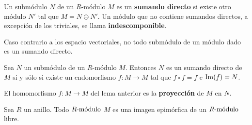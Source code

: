 \begin{definicion}
Un submódulo $N$ de un $R\mbox{-módulo}$ $M$ es un \textbf{sumando directo} si existe otro módulo $N'$ tal que $M = N \oplus N'$. Un módulo que no contiene sumandos directos, a excepción de los triviales, se llama \textbf{indescomponible}. 
\end{definicion}
Caso contrario a los espacio vectoriales, no todo submódulo de un módulo dado es un sumando directo.
\begin{lema}
Sea $N$ un submódulo de un $R\mbox{-módulo}$ $M$. Entonces $N$ es un sumando directo de $M$ si y sólo si existe un endomorfismo $f \colon M \to M$ tal que $f \circ f = f$ e $\Ima (f) = N$.
\end{lema}
El homomorfismo $f \colon M \to M$ del lema anterior es la  \textbf{proyección} de $M$ en $N$. 
\begin{proposicion}\label{prop:bimodulos}
Sea $R$ un anillo. Todo $\modulo{R}$ $M$ es una imagen epimórfica de un $\modulo{R}$ libre. 
\end{proposicion}

